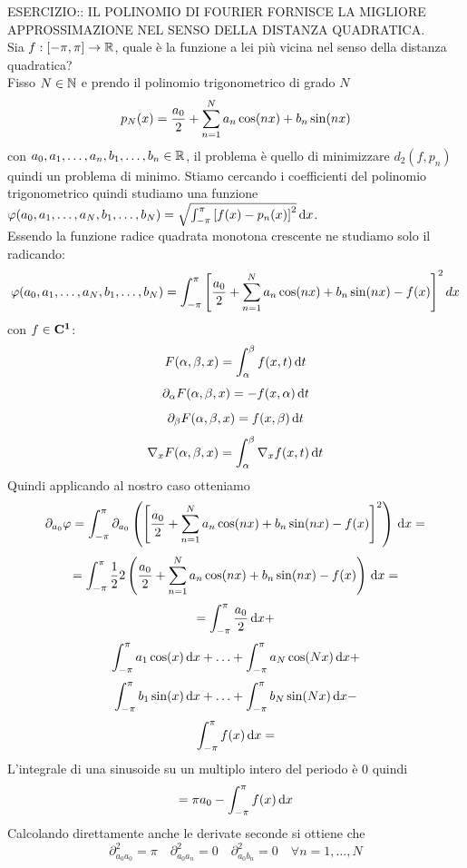 ESERCIZIO:: IL POLINOMIO DI FOURIER FORNISCE LA MIGLIORE APPROSSIMAZIONE NEL SENSO DELLA DISTANZA QUADRATICA.\\
Sia $f: \left[-\pi,\pi\right] \to \mathbb{R}$, quale è la funzione a lei più vicina nel senso della distanza quadratica?\\
Fisso $N\in\mathbb{N}$ e prendo il polinomio trigonometrico di grado $N$
\[p_N(x)=\frac{a_0}{2}+\sum\limits_{n=1}^{N}a_{n}\cos(nx)+b_{n}\sin(nx)\]
con $a_0,a_1,\dotsc,a_n,b_1,\dotsc,b_n\in \mathbb{R}$, il problema è quello di minimizzare $d_2(f,p_n)$ quindi un problema di minimo. Stiamo cercando i coefficienti del polinomio trigonometrico quindi studiamo una funzione $\varphi(a_0,a_1,\dotsc,a_N,b_1,\dotsc,b_N) = \sqrt{\int_{-\pi}^{\pi}\left[f(x)-p_n(x)\right]^2}\,\mathrm{d}{x}$.\\
Essendo la funzione radice quadrata monotona crescente ne studiamo solo il radicando:
\[\varphi(a_0,a_1,\dotsc,a_N,b_1,\dotsc,b_N)=\int_{-\pi}^{\pi}\left[\frac{a_0}{2}+\sum\limits_{n=1}^{N}a_{n}\cos(nx)+b_{n}\sin(nx)-f(x)\right]^2dx\]
\observation
con $f\in \mathbf{C^{1}}$:
\[F(\alpha,\beta,x)=\int_{\alpha}^{\beta}f(x,t)\,\mathrm{d}{t}\]
\[\partial_\alpha F(\alpha,\beta,x)=-f(x,\alpha)\,\mathrm{d}{t}\]
\[\partial_\beta F(\alpha,\beta,x)=f(x,\beta)\,\mathrm{d}{t}\]
\[\nabla_x F(\alpha,\beta,x)=\int_{\alpha}^{\beta}\nabla_xf(x,t)\,\mathrm{d}{t}\]
Quindi applicando al nostro caso otteniamo
\[\partial_{a_0}\varphi = \int_{-\pi}^{\pi}\partial_{a_0}\left(\left[\frac{a_0}{2}+\sum\limits_{n=1}^{N}a_{n}\cos(nx)+b_{n}\sin(nx)-f(x)\right]^2\right)\,\mathrm{d}{x}=\]
\[ = \int_{-\pi}^{\pi} \frac{1}{2}2\left(\frac{a_0}{2}+\sum\limits_{n=1}^{N}a_{n}\cos(nx)+b_{n}\sin(nx)-f(x)\right)\,\mathrm{d}{x}=\]
\[ =  \int_{-\pi}^{\pi} \frac{a_0}{2}\,\mathrm{d}{x} + \]
\[\int_{-\pi}^{\pi} a_1\cos(x)\,\mathrm{d}{x} +
\ldots +
\int_{-\pi}^{\pi} a_N \cos(Nx)\,\mathrm{d}{x} + \]
\[\int_{-\pi}^{\pi} b_1\sin(x)\,\mathrm{d}{x} +
\ldots +
\int_{-\pi}^{\pi} b_N \sin(Nx)\,\mathrm{d}{x} - \]
\[ \int_{-\pi}^{\pi} f(x)\,\mathrm{d}{x} = \]
L'integrale di una sinusoide su un multiplo intero del periodo è $0$ quindi
\[=\pi a_0-\int_{-\pi}^{\pi}f(x)\,\mathrm{d}{x}\]
Calcolando direttamente anche le derivate seconde si ottiene che
\[\partial^2_{a_0a_0}=\pi\quad\partial^2_{a_0a_n}=0\quad\partial^2_{a_0b_n}=0\quad\forall n=1,\dotsc,N\]

